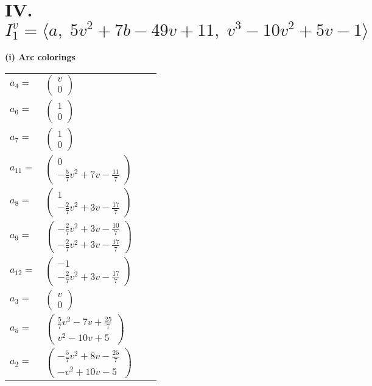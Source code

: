 \documentclass[1p]{elsarticle_modified}
\theoremstyle{definition}
\begin{document}
\centering \section*{IV. $I^v_{1}= \langle a,\;5 v^2+7 b-49 v+11,\;v^3-10 v^2+5 v-1 \rangle$}
\flushleft \textbf{(i) Arc colorings}\\
\begin{tabular}{m{7pt} m{180pt} m{7pt} m{180pt} }
\flushright $a_{4}=$&$\begin{pmatrix}v\\0\end{pmatrix}$ \\
\flushright $a_{6}=$&$\begin{pmatrix}1\\0\end{pmatrix}$ \\
\flushright $a_{7}=$&$\begin{pmatrix}1\\0\end{pmatrix}$ \\
\flushright $a_{11}=$&$\begin{pmatrix}0\\-\frac{5}{7} v^2+7 v-\frac{11}{7}\end{pmatrix}$ \\
\flushright $a_{8}=$&$\begin{pmatrix}1\\-\frac{2}{7} v^2+3 v-\frac{17}{7}\end{pmatrix}$ \\
\flushright $a_{9}=$&$\begin{pmatrix}-\frac{2}{7} v^2+3 v-\frac{10}{7}\\-\frac{2}{7} v^2+3 v-\frac{17}{7}\end{pmatrix}$ \\
\flushright $a_{12}=$&$\begin{pmatrix}-1\\-\frac{2}{7} v^2+3 v-\frac{17}{7}\end{pmatrix}$ \\
\flushright $a_{3}=$&$\begin{pmatrix}v\\0\end{pmatrix}$ \\
\flushright $a_{5}=$&$\begin{pmatrix}\frac{5}{7} v^2-7 v+\frac{25}{7}\\v^2-10 v+5\end{pmatrix}$ \\
\flushright $a_{2}=$&$\begin{pmatrix}-\frac{5}{7} v^2+8 v-\frac{25}{7}\\- v^2+10 v-5\end{pmatrix}$ \\

\end{tabular}
\end{document}

